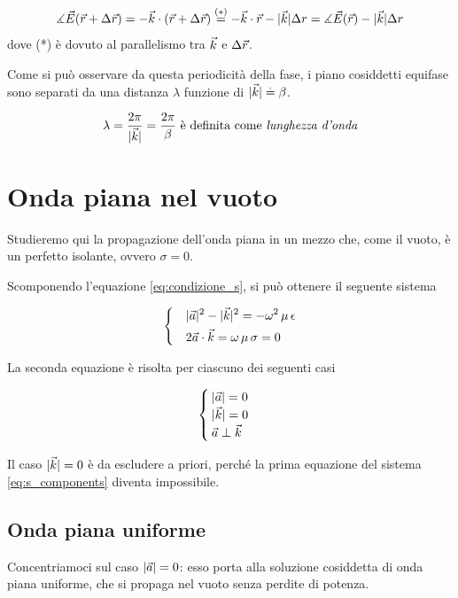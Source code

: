 \begin{itemize}
		\begin{equation*}
				\measuredangle \vec{E}(\vec{r} + \Delta\vec{r}) = -\vec{k} \cdot (\vec{r} + \Delta\vec{r}) \stackrel{(*)}{=} - \vec{k} \cdot \vec{r} - |\vec{k}| \Delta r = \measuredangle \vec{E}(\vec{r}) - |\vec{k}| \Delta r
		\end{equation*}
		dove (*) è dovuto al parallelismo tra $\vec{k}$ e $\Delta\vec{r}$.

		Come si può osservare da questa periodicità della fase, i piano cosiddetti equifase sono separati da una distanza $\lambda$ funzione di $|\vec{k}| \stackrel{.}{=} \beta$.

		\begin{equation} \label{eq:lunghezza_donda}
			\lambda = \frac{2 \pi}{|\vec{k}|} = \frac{2 \pi}{\beta} \text{ è definita come \emph{lunghezza d'onda}}
		\end{equation}
	\end{itemize}

\section{Onda piana nel vuoto}
	Studieremo qui la propagazione dell'onda piana in un mezzo che, come il vuoto, è un perfetto isolante, ovvero $\sigma = 0$.

	Scomponendo l'equazione \ref{eq:condizione_s}, si può ottenere il seguente sistema

	\begin{equation} \label{eq:s_components}
		\begin{dcases}
			& |\vec{a}|^2 - |\vec{k}|^2 = - \omega^2 \, \mu \, \epsilon \\
			& 2 \vec{a} \cdot \vec{k} = \omega \, \mu \, \sigma = 0
		\end{dcases}
	\end{equation}

	La seconda equazione è risolta per ciascuno dei seguenti casi

	\begin{equation}\begin{cases}
		|\vec{a}| = 0 \\
		|\vec{k}| = 0 \\
		\vec{a} \perp \vec{k}
	\end{cases}\end{equation}

	Il caso $|\vec{k}| = 0$ è da escludere a priori, perché la prima equazione del sistema \ref{eq:s_components} diventa impossibile.

	\subsection{Onda piana uniforme}
		Concentriamoci sul caso $|\vec{a}| = 0$: esso porta alla soluzione cosiddetta di onda piana uniforme, che si propaga nel vuoto senza perdite di potenza.

